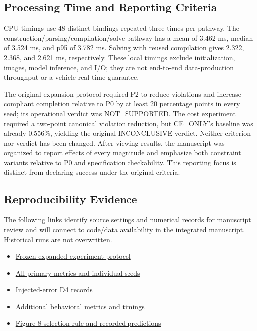 \documentclass[11pt,a4paper]{article}
\begin{document}
\subsection*{Processing Time and Reporting Criteria}

CPU timings use 48 distinct bindings repeated three times per pathway. The construction/parsing/compilation/solve pathway has a mean of 3.462 ms, median of 3.524 ms, and p95 of 3.782 ms. Solving with reused compilation gives 2.322, 2.368, and 2.621 ms, respectively. These local timings exclude initialization, images, model inference, and I/O; they are not end-to-end data-production throughput or a vehicle real-time guarantee.\par

The original expansion protocol required P2 to reduce violations and increase compliant completion relative to P0 by at least 20 percentage points in every seed; its operational verdict was NOT\_SUPPORTED. The cost experiment required a two-point canonical violation reduction, but CE\_ONLY's baseline was already 0.556\%, yielding the original INCONCLUSIVE verdict. Neither criterion nor verdict has been changed. After viewing results, the manuscript was organized to report effects of every magnitude and emphasize both constraint variants relative to P0 and specification checkability. This reporting focus is distinct from declaring success under the original criteria.\par

\begingroup\small\setlength{\parskip}{3pt}
\subsection*{Reproducibility Evidence}

The following links identify source settings and numerical records for manuscript review and will connect to code/data availability in the integrated manuscript. Historical runs are not overwritten.\par

\begin{itemize}\setlength{\itemsep}{0pt}\setlength{\parsep}{0pt}\setlength{\topsep}{2pt}
\item \href{\detokenize{../temporal-expansion-protocol-2026-09-29-001/protocol.json}}{Frozen expanded-experiment protocol}
\item \href{\detokenize{../temporal-experiment-closure-2026-09-29-001/all_primary_metrics.csv}}{All primary metrics and individual seeds}
\item \href{\detokenize{../../paper1-temporal-diversity-001/diversity-analysis-2026-09-29-001/RESULT.json}}{Injected-error D4 records}
\item \href{\detokenize{../temporal-secondary-metrics-2026-09-29-001/RESULT.json}}{Additional behavioral metrics and timings}
\item \href{\detokenize{../experiments-section-2026-09-30-002/selected_cases.json}}{Figure 8 selection rule and recorded predictions}
\end{itemize}
\end{document}
